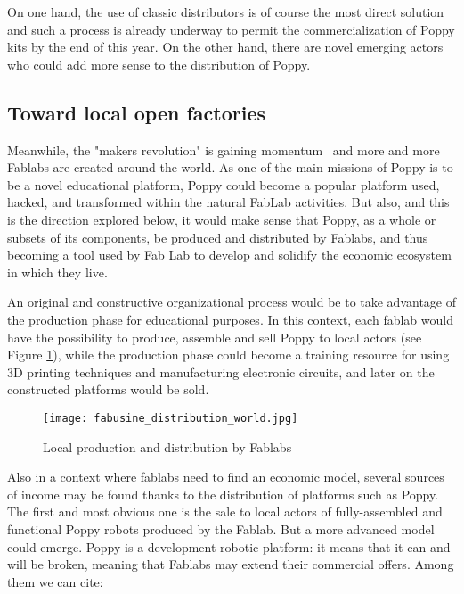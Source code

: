 On one hand, the use of classic distributors is of course the most direct solution and such a process is already underway to permit the commercialization of Poppy kits by the end of this year. On the other hand, there are novel emerging actors who could add more sense to the distribution of Poppy.


\subsection{Toward local open factories} %

Meanwhile, the "makers revolution" is gaining momentum~\parencite{anderson2012makers} and more and more Fablabs are created around the world. As one of the main missions of Poppy is to be a novel educational platform, Poppy could become a popular platform used, hacked, and transformed within the natural FabLab activities. But also, and this is the direction explored below,  it would make sense that Poppy, as a whole or subsets of its components, be produced and distributed by Fablabs, and thus becoming a tool used by Fab Lab to develop and solidify the economic ecosystem in which they live.

An original and constructive organizational process would be to take advantage of the production phase for educational purposes. In this context, each fablab would have the possibility to produce, assemble and sell Poppy to local actors (see Figure \ref{fig:world_fab}), while the production phase could become a training resource for using 3D printing techniques and manufacturing electronic circuits, and  later on the constructed platforms would be sold.

\begin{figure}[tb]
    \begin{center}
        \texttt{[image: fabusine\_distribution\_world.jpg]}
    \end{center}
    \caption{Local production and distribution by Fablabs}
    \label{fig:world_fab}
\end{figure}


Also in a context where fablabs need to find an economic model, several sources of income may be found thanks to the distribution of platforms such as Poppy. The first and most obvious one is the sale to local actors of fully-assembled and functional Poppy robots produced by the Fablab. But a more advanced model could emerge. Poppy is a development robotic platform: it means that it can and will be broken, meaning that Fablabs may extend their commercial offers. Among them we can cite:

